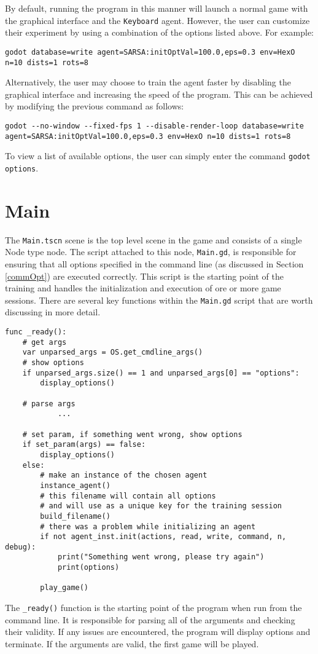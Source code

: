By default, running the program in this manner will launch a normal game with the graphical interface and the \texttt{Keyboard} agent. However, the user can customize their experiment by using a combination of the options listed above. For example:
\begin{lstlisting}
godot database=write agent=SARSA:initOptVal=100.0,eps=0.3 env=HexO n=10 dists=1 rots=8
\end{lstlisting}

Alternatively, the user may choose to train the agent faster by disabling the graphical interface and increasing the speed of the program. This can be achieved by modifying the previous command as follows:

\begin{lstlisting}
godot --no-window --fixed-fps 1 --disable-render-loop database=write agent=SARSA:initOptVal=100.0,eps=0.3 env=HexO n=10 dists=1 rots=8
\end{lstlisting}

To view a list of available options, the user can simply enter the command \texttt{godot options}.

\section{Main}
The \texttt{Main.tscn} scene is the top level scene in the game and consists of a single Node type node. The script attached to this node, \texttt{Main.gd}, is responsible for ensuring that all options specified in the command line (as discussed in Section \ref{commOpt}) are executed correctly. This script is the starting point of the training and handles the initialization and execution of ore or more game sessions.
There are several key functions within the \texttt{Main.gd} script that are worth discussing in more detail.

\begin{lstlisting}
func _ready():
    # get args
    var unparsed_args = OS.get_cmdline_args()
    # show options
    if unparsed_args.size() == 1 and unparsed_args[0] == "options":
        display_options()
        
    # parse args
    		...
            
    # set param, if something went wrong, show options
    if set_param(args) == false:
        display_options()
    else:
        # make an instance of the chosen agent
        instance_agent()
        # this filename will contain all options 
        # and will use as a unique key for the training session
        build_filename()
        # there was a problem while initializing an agent
        if not agent_inst.init(actions, read, write, command, n, debug):
            print("Something went wrong, please try again")
            print(options)

        play_game()
\end{lstlisting}
The \texttt{\_ready()} function is the starting point of the program when run from the command line. It is responsible for parsing all of the arguments and checking their validity. If any issues are encountered, the program will display options and terminate. If the arguments are valid, the first game will be played. 

